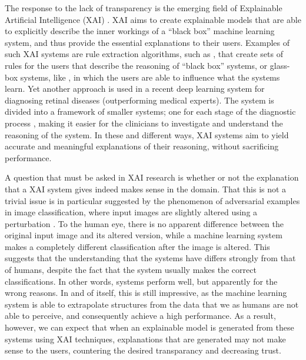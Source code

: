 \documentclass[letterpaper]{article} %
\begin{document}
The response to the lack of transparency is the emerging field of Explainable Artificial Intelligence (XAI) \cite{gunning2017explainable}. XAI aims to create explainable models that are able to explicitly describe the inner workings of a ``black box'' machine learning system, and thus provide the essential explanations to their users. Examples of such XAI systems are rule extraction algorithms, such as \cite{lu2017neurorule}, that create  sets of rules for the users that describe the reasoning of ``black box'' systems, or glass-box systems, like \cite{holzinger2017glass}, in which the users are able to influence what the systems learn. Yet another approach is used in a recent deep learning system for diagnosing retinal diseases (outperforming medical experts). The system is divided into a framework of smaller systems; one for each stage of the diagnostic process \cite{de2018clinically}, making it easier for the clinicians to investigate and understand the reasoning of the system. In these and different ways, XAI systems aim to yield accurate and meaningful explanations of their reasoning, without sacrificing performance. 

A question that must be asked in XAI research is whether or not the explanation that a XAI system gives indeed makes sense in the domain. That this is not a trivial issue is in particular suggested by the phenomenon of adversarial examples in image classification, where input images are slightly altered using a perturbation \cite{yuan2017adversarial}. To the human eye, there is no apparent difference between the original input image and its altered version, while a machine learning system makes a completely different classification after the image is altered. This suggests that the understanding that the systems have differs strongly from that of humans, despite the fact that the system usually makes the correct classifications. In other words, systems perform well, but apparently for the wrong reasons. In and of itself, this is still impressive, as the machine learning system is able to extrapolate structures from the data that we as humans are not able to perceive, and consequently achieve a high performance. As a result, however, we can expect that when an explainable model is generated from these systems using XAI techniques, explanations that are generated may not make sense to the users, countering the desired transparancy and decreasing trust. 
\end{document}
